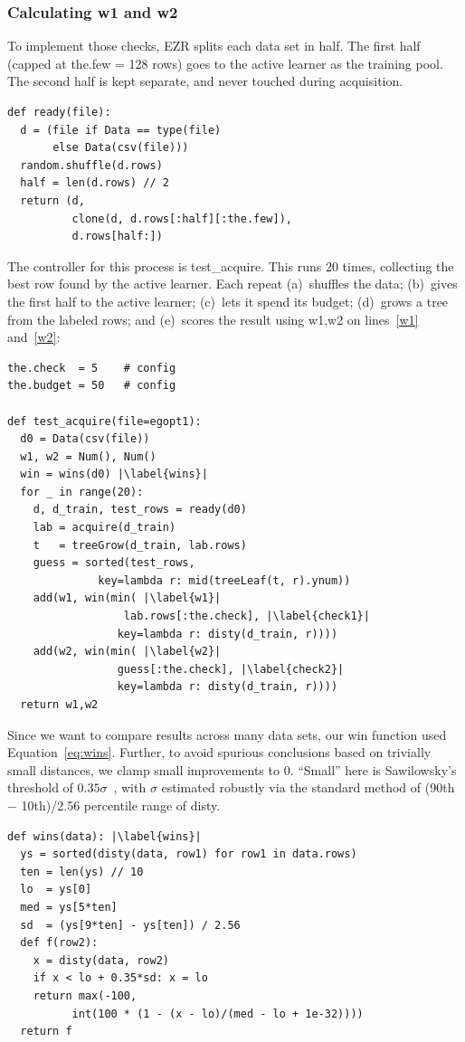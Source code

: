 \documentclass[AMA,STIX2COL]{WileyNJDv5}
\begin{document}
{\subsubsection{Calculating \textsf{w1} and \textsf{w2}}
To implement those checks, EZR splits each data set in half.
The first half (capped at \textsf{the.few} = 128 rows) goes to
the active learner as the training pool. The second half is
kept separate, and never touched during acquisition.
\begin{verbatim}
def ready(file):
  d = (file if Data == type(file)
       else Data(csv(file)))
  random.shuffle(d.rows)
  half = len(d.rows) // 2
  return (d, 
          clone(d, d.rows[:half][:the.few]),
          d.rows[half:])
\end{verbatim}
The controller for this process is \textsf{test\_acquire}. This runs 
20 times, collecting the best row found by the active learner. Each 
repeat (a)~shuffles the data; (b)~gives the first half to the active 
learner; (c)~lets it spend its budget; (d)~grows a tree from the 
labeled rows; and (e)~scores the result using \textsf{w1,w2}  on lines~\ref{w1} 
and~\ref{w2}:
\begin{verbatim}
the.check  = 5    # config
the.budget = 50   # config

def test_acquire(file=egopt1):
  d0 = Data(csv(file))
  w1, w2 = Num(), Num()
  win = wins(d0) |\label{wins}|
  for _ in range(20):
    d, d_train, test_rows = ready(d0)
    lab = acquire(d_train)
    t   = treeGrow(d_train, lab.rows)
    guess = sorted(test_rows,
              key=lambda r: mid(treeLeaf(t, r).ynum))
    add(w1, win(min( |\label{w1}|
                  lab.rows[:the.check], |\label{check1}|
                 key=lambda r: disty(d_train, r))))
    add(w2, win(min( |\label{w2}|
                 guess[:the.check], |\label{check2}|
                 key=lambda r: disty(d_train, r))))
  return w1,w2
\end{verbatim}
Since we want to compare results across
many data sets,
our \textsf{win} function used
Equation~\ref{eq:wins}. Further,
to avoid spurious conclusions based on trivially
small distances, we
clamp small improvements to 0. ``Small'' here is Sawilowsky's
threshold of $0.35\sigma$~\cite{sawilowsky2009new}, with $\sigma$
estimated robustly via  the standard method of   (90th $-$ 10th)/2.56 percentile range
of \textsf{disty}.
\begin{verbatim}
def wins(data): |\label{wins}| 
  ys = sorted(disty(data, row1) for row1 in data.rows)
  ten = len(ys) // 10
  lo  = ys[0]
  med = ys[5*ten]
  sd  = (ys[9*ten] - ys[ten]) / 2.56
  def f(row2):
    x = disty(data, row2)
    if x < lo + 0.35*sd: x = lo
    return max(-100,
          int(100 * (1 - (x - lo)/(med - lo + 1e-32))))
  return f
\end{verbatim}

}
\end{document}
